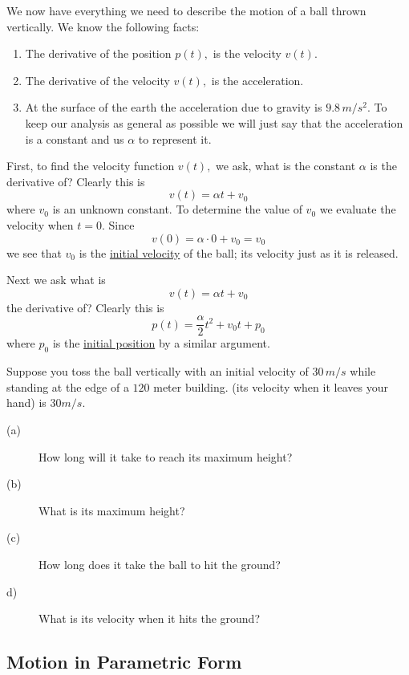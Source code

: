 We now have everything we need to describe the motion of a ball thrown
vertically. We know the following facts:
\begin{enumerate}
\item The derivative of the position $p(t),$ is the velocity $v(t).$
\item The derivative of the velocity $v(t),$ is the acceleration.
\item At the surface of the earth the acceleration due to gravity is
  $9.8\,m/s^2.$ To keep our analysis as general as possible we will
  just say that the acceleration is a constant and us $\alpha$ to
  represent it.
\end{enumerate}

First, to find the velocity function $v(t),$ we ask, what is the
constant $\alpha$ is the derivative of? Clearly this is
$$
v(t) =\alpha t+ v_0
$$
where $v_0$ is an unknown constant. To determine the value of $v_0$
we evaluate the velocity when $t=0.$ Since 
$$
v(0) = \alpha\cdot0+v_0 = v_0
$$
we see that $v_0$ is the \underline{initial velocity} of the ball;
its velocity just as it is released.

Next we ask what is 
$$
v(t) = \alpha t+v_0
$$ 
the derivative of? Clearly this is 
$$
p(t) = \frac{\alpha}{2}t^2+v_0t+p_0
$$
where $p_0$ is the \underline{initial position} by a similar argument.

\begin{myexample}
  Suppose you toss the ball vertically with an  initial velocity of
  $30\,m/s$ while standing at the edge of a $120$ meter building.
  (its velocity when it leaves your hand) is $30 m/s.$ 
  \begin{description}
  \item[(a)] How long will it take to reach its maximum height?
  \item[(b)] What is its maximum height?
  \item[(c)] How long does it take the ball to hit the ground?
  \item[d)] What is its velocity when it hits the ground?
  \end{description}
\end{myexample}

\subsection{Motion in Parametric Form}
\label{subsec:moti-param-form}

